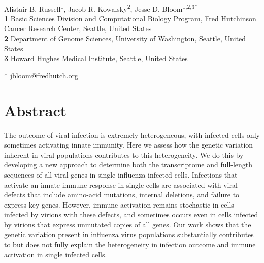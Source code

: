 \documentclass[10pt,letterpaper]{article}
\begin{document}
\vspace*{0.2in}

\begin{flushleft}
{\Large
\textbf{} %
}
\newline
\\
Alistair B. Russell\textsuperscript{1},
Jacob R. Kowalsky\textsuperscript{2},
Jesse D. Bloom\textsuperscript{1,2,3*}
\\
\bigskip
\textbf{1} Basic Sciences Division and Computational Biology Program, Fred Hutchinson Cancer Research Center, Seattle, United States
\\
\textbf{2} Department of Genome Sciences, University of Washington, Seattle, United States
\\
\textbf{3} Howard Hughes Medical Institute, Seattle, United States
\\
\bigskip

* jbloom@fredhutch.org

\end{flushleft}
\section*{Abstract}
The outcome of viral infection is extremely heterogeneous, with infected cells only sometimes activating innate immunity.  
Here we assess how the genetic variation inherent in viral populations contributes to this heterogeneity.
We do this by developing a new approach to determine both the transcriptome and full-length sequences of all viral genes in single influenza-infected cells.
Infections that activate an innate-immune response in single cells are associated with viral defects that include amino-acid mutations, internal deletions, and failure to express key genes.  
However, immune activation remains stochastic in cells infected by virions with these defects, and sometimes occurs even in cells infected by virions that express unmutated copies of all genes.
Our work shows that the genetic variation present in influenza virus populations substantially contributes to but does not fully explain the heterogeneity in infection outcome and immune activation in single infected cells.
\end{document}
